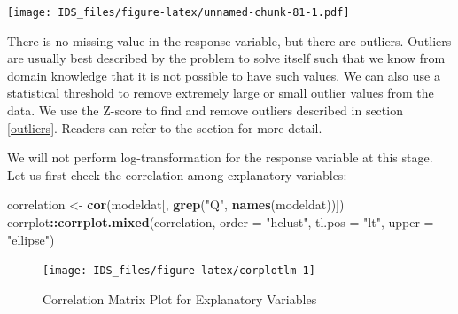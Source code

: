 \documentclass[12pt,]{krantz}
\makeatletter
\newenvironment{Shaded}{\begin{snugshade}}{\end{snugshade}}
\newcommand{\CommentTok}[1]{\textcolor[rgb]{0.37,0.37,0.37}{\textit{#1}}}
\newcommand{\DataTypeTok}[1]{\textcolor[rgb]{0.27,0.27,0.27}{#1}}
\newcommand{\FloatTok}[1]{\textcolor[rgb]{0.06,0.06,0.06}{#1}}
\newcommand{\KeywordTok}[1]{\textcolor[rgb]{0.27,0.27,0.27}{\textbf{#1}}}
\newcommand{\NormalTok}[1]{#1}
\newcommand{\OperatorTok}[1]{\textcolor[rgb]{0.43,0.43,0.43}{\textbf{#1}}}
\newcommand{\StringTok}[1]{\textcolor[rgb]{0.5,0.5,0.5}{#1}}
\newenvironment{kframe}{%
\medskip{}
\setlength{\fboxsep}{.8em}
 \def\at@end@of@kframe{}%
 \ifinner\ifhmode%
  \def\at@end@of@kframe{\end{minipage}}%
  \begin{minipage}{\columnwidth}%
 \fi\fi%
 \def\FrameCommand##1{\hskip\@totalleftmargin \hskip-\fboxsep
 \colorbox{shadecolor}{##1}\hskip-\fboxsep
     \hskip-\linewidth \hskip-\@totalleftmargin \hskip\columnwidth}%
 \MakeFramed {\advance\hsize-\width
   \@totalleftmargin\z@ \linewidth\hsize
   \@setminipage}}%
 {\par\unskip\endMakeFramed%
 \at@end@of@kframe}
\renewenvironment{Shaded}{\begin{kframe}}{\end{kframe}}
\makeatother
\begin{document}
\texttt{[image: IDS\_files/figure-latex/unnamed-chunk-81-1.pdf]}

There is no missing value in the response variable, but there are outliers. Outliers are usually best described by the problem to solve itself such that we know from domain knowledge that it is not possible to have such values. We can also use a statistical threshold to remove extremely large or small outlier values from the data. We use the Z-score to find and remove outliers described in section \ref{outliers}. Readers can refer to the section for more detail.

\begin{Shaded}
\end{Shaded}

We will not perform log-transformation for the response variable at this stage. Let us first check the correlation among explanatory variables:

\begin{Shaded}
\begin{Highlighting}[]
\NormalTok{correlation <-}\StringTok{ }\KeywordTok{cor}\NormalTok{(modeldat[, }\KeywordTok{grep}\NormalTok{(}\StringTok{"Q"}\NormalTok{, }\KeywordTok{names}\NormalTok{(modeldat))])}
\NormalTok{corrplot}\OperatorTok{::}\KeywordTok{corrplot.mixed}\NormalTok{(correlation, }\DataTypeTok{order =} \StringTok{"hclust"}\NormalTok{, }\DataTypeTok{tl.pos =} \StringTok{"lt"}\NormalTok{, }
    \DataTypeTok{upper =} \StringTok{"ellipse"}\NormalTok{)}
\end{Highlighting}
\end{Shaded}

\begin{figure}

{\centering \texttt{[image: IDS\_files/figure-latex/corplotlm-1]} 

}

\caption{Correlation Matrix Plot for Explanatory Variables}\label{fig:corplotlm}
\end{figure}
\end{document}

